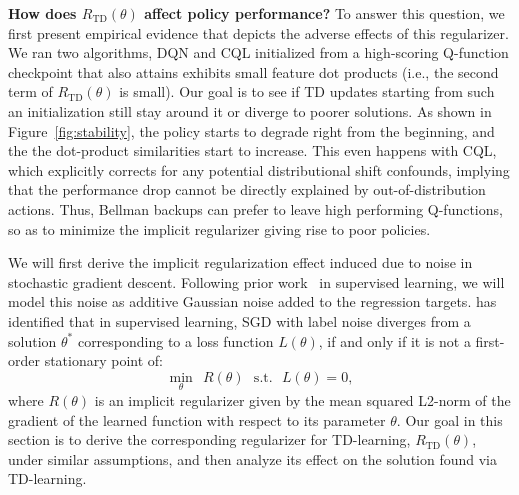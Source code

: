 \textbf{How does $R_\mathrm{TD}(\theta)$ affect policy performance?} To answer this question, we first present empirical evidence that depicts the adverse effects of this regularizer. We ran two algorithms, DQN and CQL initialized from a high-scoring Q-function checkpoint that also attains exhibits small feature dot products (i.e., the second term of $R_\mathrm{TD}(\theta)$ is small). Our goal is to see if TD updates starting from such an initialization still stay around it or diverge to poorer solutions. As shown in Figure~\ref{fig:stability}, the policy starts to degrade right from the beginning, and the the dot-product similarities start to increase. This even happens with CQL, which explicitly corrects for any potential distributional shift confounds, implying that the performance drop cannot be directly explained by out-of-distribution actions. Thus, Bellman backups can prefer to leave high performing Q-functions, so as to minimize the implicit regularizer giving rise to poor policies. %

\iffalse
We will first derive the implicit regularization effect induced due to noise in stochastic gradient descent. Following prior work~\citep{blanc2020implicit} in supervised learning, we will model this noise as additive Gaussian noise added to the regression targets. \citet{blanc2020implicit} has identified that in supervised learning, SGD with label noise
diverges from a solution $\theta^*$ corresponding to a loss function $L(\theta)$, if and only if it is not a first-order stationary point of:
\begin{equation*}
    \min_\theta~~ R(\theta) ~~~ \text{s.t.}~~~ L(\theta) = 0,
\end{equation*}
where $R(\theta)$ is an implicit regularizer given by the mean squared L2-norm of the gradient of the learned function with respect to its parameter $\theta$.
Our goal in this section is to derive the corresponding regularizer for TD-learning, $R_\mathrm{TD}(\theta)$, under similar assumptions, and then analyze its effect on the solution found via TD-learning.  

